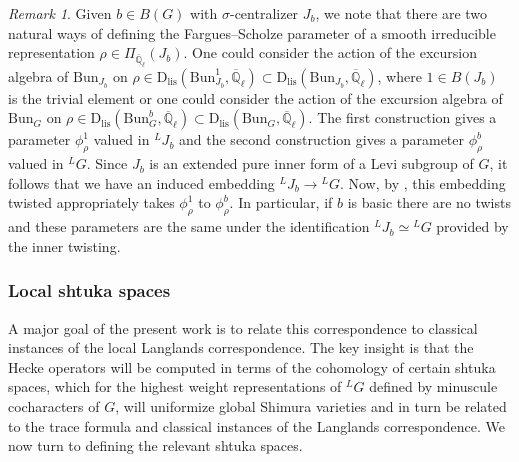 \documentclass[reqno,11pt]{amsart}
\theoremstyle{remark}
\newtheorem{remark}[theorem]{Remark}
\newcommand{\Q}{\mathbb{Q}}
\newcommand{\ov}{\overline}
\newcommand{\Bun}{\mathrm{Bun}}
\newcommand{\Dlis}{\mathrm{D}_{\mathrm{lis}}}
\def\ol{\overline}
\def\ra{\rightarrow}
\begin{document}
\begin{remark}
Given $b \in B(G)$ with $\sigma$-centralizer $J_{b}$, we note that there are two natural ways of defining the Fargues--Scholze parameter of a smooth irreducible representation $\rho \in \Pi_{\ov{\Q}_{\ell}}(J_{b})$. One could consider the action of the excursion algebra of $\Bun_{J_{b}}$ on $\rho \in \Dlis(\Bun_{J_{b}}^{1},\ol{\mathbb{Q}}_{\ell}) \subset \Dlis(\Bun_{J_{b}},\ol{\mathbb{Q}}_{\ell})$, where $1 \in B(J_{b})$ is the trivial element or one could consider the action of the excursion algebra of $\Bun_{G}$ on $\rho \in \Dlis(\Bun_{G}^{b},\ol{\mathbb{Q}}_{\ell}) \subset \Dlis(\Bun_{G},\ol{\mathbb{Q}}_{\ell})$. The first construction gives a parameter $\phi_{\rho}^{1}$ valued in $\phantom{}^{L}J_{b}$ and the second construction gives a parameter $\phi_{\rho}^{b}$ valued in $\phantom{}^{L}G$. Since $J_{b}$ is an extended pure inner form of a Levi subgroup of $G$, it follows that we have an induced embedding $\phantom{}^{L}J_{b} \ra \phantom{}^{L}G$. Now, by \cite[Theorem~IX.7.2]{FS}, this embedding twisted appropriately takes $\phi_{\rho}^{1}$ to $\phi_{\rho}^{b}$. In particular, if $b$ is basic there are no twists and these parameters are the same under the identification $\phantom{}^{L}J_{b} \simeq \phantom{}^{L}G$ provided by the inner twisting.  
\end{remark}
\subsubsection{Local shtuka spaces}
A major goal of the present work is to relate this correspondence to classical instances of the local Langlands correspondence. The key insight is that the Hecke operators will be computed in terms of the cohomology of certain shtuka spaces, which for the highest weight representations of $\phantom{}^{L}G$ defined by minuscule cocharacters of $G$, will uniformize global Shimura varieties and in turn be related to the trace formula and classical instances of the Langlands correspondence. We now turn to defining the relevant shtuka spaces.
\end{document}
